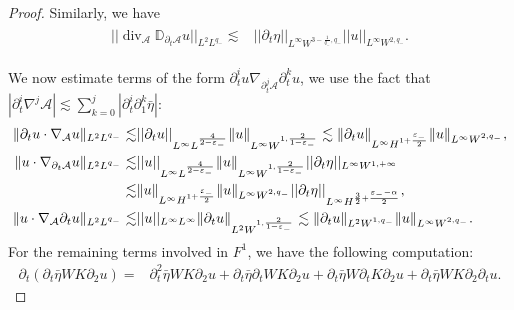 \documentclass[letterpaper,reqno,10pt,twoside]{amsart}
\theoremstyle{definition}
\theoremstyle{remark}
\def\p{\partial}
\begin{document}
\begin{proof}
		\noindent Similarly, we have
		\begin{align}
			\begin{aligned}
				\vert \vert \operatorname{div}_{\mathcal{A}}\mathbb{D}_{\partial_{t}\mathcal{A}}u\vert \vert_{L^{2}L^{q_{-}}}\lesssim& \vert \vert \partial_{t}\eta\vert \vert_{L^{\infty}W^{3-\frac{1}{q_{-}},q_{-}}}\vert \vert u\vert \vert_{L^{\infty}W^{2,q_{-}}}.
			\end{aligned}
		\end{align}
		
		\noindent  We now estimate terms of the form $\partial_{t}^{i}u\nabla_{\partial_{t}^{j}\mathcal{A}}\partial_{t}^{k}u$, we use the fact that $|\partial_{t}^{i}\nabla^{j}\mathcal{A}|\lesssim  \sum_{k=0}^{j}|\partial_{t}^{i}\partial_{1}^{k}\bar{\eta}|$:
		\begin{align}{\label{eq:f_2}}
			\begin{aligned}
				\| {\partial_{t}}u\cdot \nabla_{\mathcal{A}}u\|_{L^{2}L^{q_{-}}}\lesssim& \vert \vert \partial_{t}u\vert \vert_{L^{\infty}L^{\frac{4}{2-\varepsilon_-}}}\| u\|_{L^{\infty}W^{1,\frac{2}{1-\varepsilon_{-}}}}\lesssim \|\partial_{t}u\|_{L^{\infty}H^{1+\frac{\varepsilon_{-}}{2}}}\|u\|_{L^{\infty}W^{2,q_{-}}},\\
				\| u\cdot \nabla_{\partial_{t}\mathcal{A}}u\|_{L^{2}L^{q_{-}}}\lesssim& \vert \vert u\vert \vert_{L^{\infty}L^{\frac{4}{2-\varepsilon_-}}}\| u\|_{L^{\infty}W^{1,\frac{2}{1-\varepsilon_{-}}}}\vert \vert \partial_{t}\eta\vert \vert_{L^{\infty}W^{1,+\infty}}\\
				\lesssim& \|u\|_{L^{\infty}H^{1+\frac{\varepsilon_{-}}{2}}}\|u\|_{L^{\infty}W^{2,q_{-}}}\vert \vert \partial_{t}{\eta}\vert \vert_{L^{\infty}H^{\frac{3}{2}+\frac{\varepsilon_{-}-\alpha}{2}}},\\
				\| u\cdot \nabla_{\mathcal{A}}\p_{t}u\|_{L^{2}L^{q_{-}}}\lesssim& \vert \vert u \vert \vert_{L^{\infty}L^{\infty}}\| \partial_{t}u\|_{L^{2}W^{1,\frac{2}{1-\varepsilon_{-}}}}\lesssim \|\partial_{t}u\|_{L^{2}W^{1,q_{-}}}\|u\|_{L^{\infty}W^{2,q_{-}}}.
			\end{aligned}
		\end{align}
		For the remaining terms involved in $F^{1}$, we have the following computation:
		\begin{align}
			\partial_{t}(\p_{t}\bar{\eta}WK\partial_{2}u)=&\partial_{t}^{2}\bar{\eta}WK\partial_{2}u+\partial_{t}\bar{\eta}\p_{t}WK\partial_{2}u+\partial_{t}\bar{\eta}W\p_{t}K\partial_{2}u+\partial_{t}\bar{\eta}WK\partial_{2}\p_{t}u.
		\end{align}
		

\end{proof}
\end{document}
